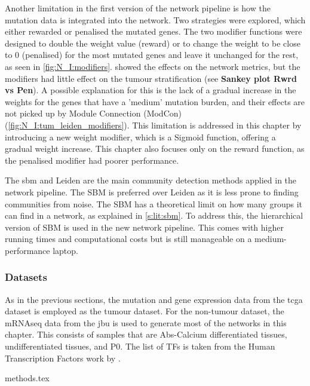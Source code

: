 Another limitation in the first version of the network pipeline is how the mutation data is integrated into the network. Two strategies were explored, which either rewarded or penalised the mutated genes. The two modifier functions were designed to double the weight value (reward) or to change the weight to be close to 0 (penalised) for the most mutated genes and leave it unchanged for the rest, as seen in \cref{fig:N_I:modifiers}.  showed the effects on the network metrics, but the modifiers had little effect on the tumour stratification (see \textbf{Sankey plot Rwrd vs Pen}). A possible explanation for this is the lack of a gradual increase in the weights for the genes that have a 'medium' mutation burden, and their effects are not picked up by Module Connection (ModCon) (\cref{fig:N_I:tum_leiden_modifiers}). This limitation is addressed in this chapter by introducing a new weight modifier, which is a Sigmoid function, offering a gradual weight increase. This chapter also focuses only on the reward function, as the penalised modifier had poorer performance.


The \acrfull{sbm} and Leiden are the main community detection methods applied in the network pipeline. The SBM is preferred over Leiden as it is less prone to finding communities from noise. The SBM has a theoretical limit on how many groups it can find in a network, as explained in \cref{s:lit:sbm}. To address this, the hierarchical version of SBM is used in the new network pipeline. This comes with higher running times and computational costs but is still manageable on a medium-performance laptop.


\subsubsection{Datasets}

As in the previous sections, the mutation and gene expression data from the \acrshort{tcga} dataset is employed as the tumour dataset. For the non-tumour dataset, the mRNAseq data from the \acrfull{jbu} is used to generate most of the networks in this chapter. This consists of samples that are Abs-Calcium differentiated tissues, undifferentiated tissues, and P0. The list of TFs is taken from the Human Transcription Factors work by \citet{Lambert2018-el}.



{methods.tex}


